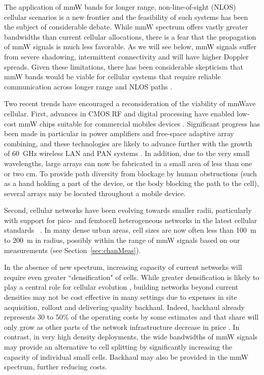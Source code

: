 \documentclass[journal]{IEEEtran}
\begin{document}
The application of mmW bands for longer range, non-line-of-sight (NLOS)
cellular scenarios is a new frontier
and the feasibility of such systems has been the subject of considerable debate.
While mmW spectrum offers vastly greater bandwidths than current cellular
allocations,
there is a fear that the propagation of mmW signals is much less favorable.
As we will see below, mmW signals suffer from severe shadowing,
intermittent connectivity and will have higher Doppler spreads.
Given these limitations,  there has been considerable skepticism that
mmW bands would be viable for cellular systems
that require reliable communication across longer range and NLOS
paths \cite{Daniels:10,rappaportmillimeter}.

Two recent trends have encouraged a reconsideration of the viability of mmWave cellular.
First, advances in CMOS RF and digital processing have enabled low-cost
mmW chips suitable for commercial mobiles devices
 \cite{Doan:04,Ted:60Gstate11,Rappaport:13-BBmmW}.
Significant progress has been made in particular in power amplifiers and
free-space adaptive array combining, and
these technologies are likely to advance further with the growth of 60~GHz wireless LAN
and PAN systems \cite{Ted:60Gstate11,Daniels:10,PerCPY:10,VauNic:10,Baykas-WPAN:11}.
In addition, due to the very small wavelengths,
large arrays can now be fabricated in a small area
of less than one or two cm.
To provide path diversity from blockage by human obstructions (such
as a hand holding a part of the device, or the body blocking the path to the cell),
several arrays may be located throughout a mobile device.

Second, cellular networks have been evolving towards smaller radii,
particularly with support for
pico- and femtocell heterogeneous networks in the latest cellular standards
~\cite{Ortiz:08,ChaAndG:08,YehTLK:08,FemtoForum:10,AndrewsCDRC:12}.
In many dense urban areas, cell sizes are now often less than 100~m to 200~m
in radius, possibly within the range
of mmW signals based on our measurements (see Section~\ref{sec:chanMeas}).

In the absence of new spectrum, increasing
capacity of current networks will require even greater ``densification" of cells.
While greater densification is likely to play a central role
for cellular evolution \cite{FemtoForum:10,AndrewsCDRC:12,Qualcomm-SmallCell},
building networks beyond current
densities may not be cost effective in many settings due to
expenses in site acquisition, rollout and delivering quality
backhaul.  Indeed, backhaul already represents 30 to 50\% of the operating
costs by some estimates  \cite{financial_picos,senza_backhaul}
and that share will only grow as other parts of the network infrastructure
decrease in price
\cite{backhaul_blog_1,backhaul_blog_2,financial_picos}.
In contrast, in very high density deployments, the wide bandwidths of mmW signals
may provide an alternative to cell splitting by significantly increasing the capacity
of individual small cells.
Backhaul may also be provided in the mmW spectrum, further reducing costs.
\end{document}
